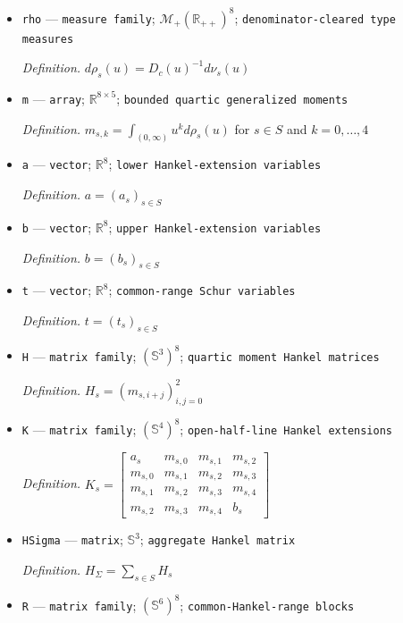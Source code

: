 \documentclass{article}
\begin{document}
\begin{itemize}
  \item \texttt{rho} --- \texttt{measure family}; \(\mathcal M_+(\mathbb R_{++})^8\); \texttt{denominator-\allowbreak{}cleared type measures}
  \par\smallskip\noindent\emph{Definition.} \(d\rho_s(u)=D_c(u)^{-1}d\nu_s(u)\)
  \item \texttt{m} --- \texttt{array}; \(\mathbb R^{8\times5}\); \texttt{bounded quartic generalized moments}
  \par\smallskip\noindent\emph{Definition.} \(m_{s,k}=\int_{(0,\infty)}u^k d\rho_s(u)\) for \(s\in S\) and \(k=0,\ldots,4\)
  \item \texttt{a} --- \texttt{vector}; \(\mathbb R^8\); \texttt{lower Hankel-\allowbreak{}extension variables}
  \par\smallskip\noindent\emph{Definition.} \(a=(a_s)_{s\in S}\)
  \item \texttt{b} --- \texttt{vector}; \(\mathbb R^8\); \texttt{upper Hankel-\allowbreak{}extension variables}
  \par\smallskip\noindent\emph{Definition.} \(b=(b_s)_{s\in S}\)
  \item \texttt{t} --- \texttt{vector}; \(\mathbb R^8\); \texttt{common-\allowbreak{}range Schur variables}
  \par\smallskip\noindent\emph{Definition.} \(t=(t_s)_{s\in S}\)
  \item \texttt{H} --- \texttt{matrix family}; \((\mathbb S^3)^8\); \texttt{quartic moment Hankel matrices}
  \par\smallskip\noindent\emph{Definition.} \(H_s=(m_{s,i+j})_{i,j=0}^2\)
  \item \texttt{K} --- \texttt{matrix family}; \((\mathbb S^4)^8\); \texttt{open-\allowbreak{}half-\allowbreak{}line Hankel extensions}
  \par\smallskip\noindent\emph{Definition.} \(K_s=\begin{bmatrix}a_s&m_{s,0}&m_{s,1}&m_{s,2}\\m_{s,0}&m_{s,1}&m_{s,2}&m_{s,3}\\m_{s,1}&m_{s,2}&m_{s,3}&m_{s,4}\\m_{s,2}&m_{s,3}&m_{s,4}&b_s\end{bmatrix}\)
  \item \texttt{HSigma} --- \texttt{matrix}; \(\mathbb S^3\); \texttt{aggregate Hankel matrix}
  \par\smallskip\noindent\emph{Definition.} \(H_{\Sigma}=\sum_{s\in S}H_s\)
  \item \texttt{R} --- \texttt{matrix family}; \((\mathbb S^6)^8\); \texttt{common-\allowbreak{}Hankel-\allowbreak{}range blocks}

\end{itemize}
\end{document}

